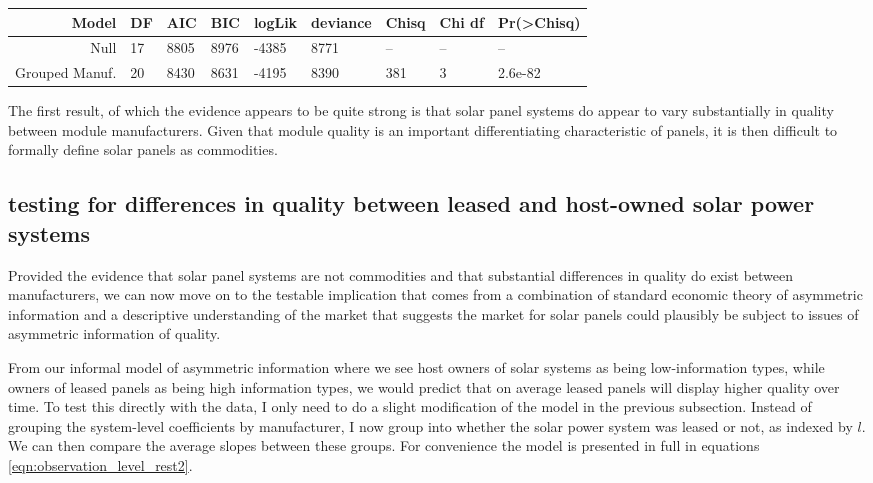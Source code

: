 \documentclass[12pt]{article}
\begin{document}
\begin{table}
  \begin{tabular}{rllllllll}
  \toprule
    Model &  DF &   AIC &   BIC &  logLik &  deviance &  Chisq &  Chi df &  Pr(>Chisq) \\
    \midrule
             Null &  17 &  8805 &  8976 &   -4385 &      8771 &     -- &      -- &          -- \\
    Grouped Manuf. &  20 &  8430 &  8631 &   -4195 &      8390 &    381 &       3 &     2.6e-82 \\
  \bottomrule
  \end{tabular}
  \label{tbl:lm_commodity}
\end{table}

The first result, of which the evidence appears to be quite strong is that solar panel systems do appear to vary substantially in quality between module manufacturers. Given that module quality is an important differentiating characteristic of panels, it is then difficult to formally define solar panels as commodities.

\subsection{testing for differences in quality between leased and host-owned solar power systems}

Provided the evidence that solar panel systems are not commodities and that substantial differences in quality do exist between manufacturers, we can now move on to the testable implication that comes from a combination of standard economic theory of asymmetric information and a descriptive understanding of the market that suggests the market for solar panels could plausibly be subject to issues of asymmetric information of quality.

From our informal model of asymmetric information where we see host owners of solar systems as being low-information types, while owners of leased panels as being high information types, we would predict that on average leased panels will display higher quality over time. To test this directly with the data, I only need to do a slight modification of the model in the previous subsection. Instead of grouping the system-level coefficients by manufacturer, I now group into whether the solar power system was leased or not, as indexed by $l$. We can then compare the average slopes between these groups. For convenience the model is presented in full in equations \ref{eqn:observation_level_rest2}.
\end{document}
